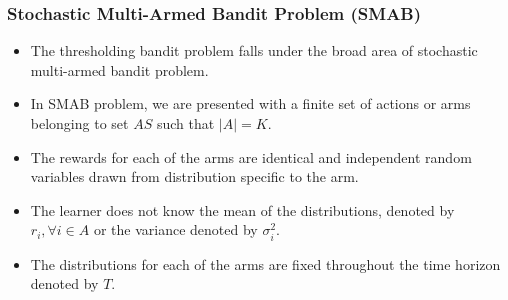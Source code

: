 \begin{frame}
\frametitle{Stochastic Multi-Armed Bandit Problem (SMAB)}
\begin{itemize}
\item<1-> The thresholding bandit problem falls under the broad area of stochastic multi-armed bandit problem.
\item<2-> In SMAB problem, we are presented with a finite set of actions or arms belonging to set $AS$ such that $|A|=K$. 
\item<3-> The rewards for each of the arms are identical and independent random variables drawn from distribution specific to the arm.
\item<4-> The learner does not know the mean of the distributions, denoted by $r_{i},\forall i\in A$ or  the variance denoted by $\sigma_i^2$. 
\item<5-> The distributions for each of the arms are fixed throughout the time horizon denoted by $T$. 
\end{itemize}
\end{frame}


